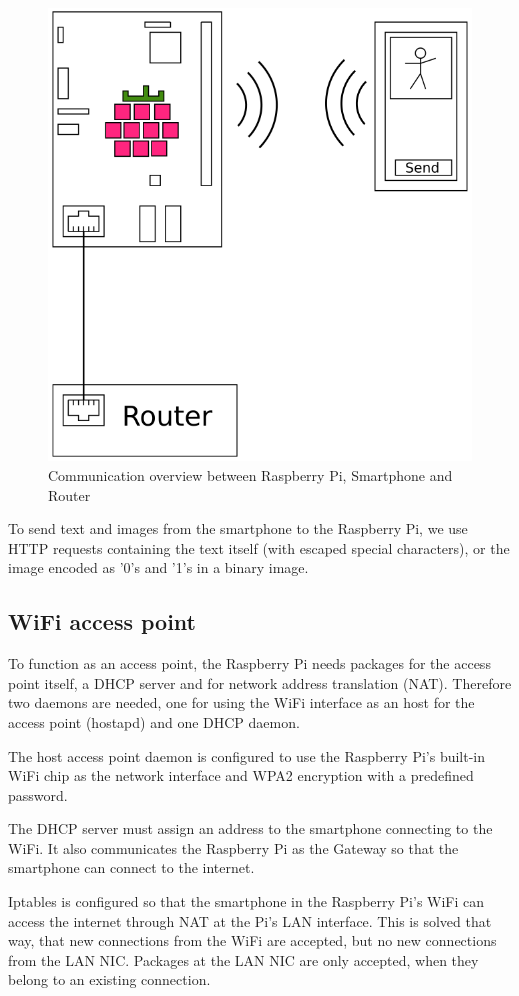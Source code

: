 \documentclass[conference]{IEEEtran}
\begin{document}
\begin{figure}[ht]
\centering
\includegraphics[width=0.75\linewidth]{pics/RasPi-MC}
\caption{Communication overview between Raspberry Pi, Smartphone and Router}
\label{FIG:COMMUNICATION}
\end{figure}

To send text and images from the smartphone to the Raspberry Pi, we use HTTP requests containing the text itself (with escaped special characters), or the image encoded as '0's and '1's in a binary image.

\subsection{WiFi access point}
To function as an access point, the Raspberry Pi needs packages for the access point itself, a DHCP server and for network address translation (NAT). Therefore two daemons are needed, one for using the WiFi interface as an host for the access point (hostapd) and one DHCP daemon.

The host access point daemon is configured to use the Raspberry Pi's built-in WiFi chip as the network interface and WPA2  encryption with a predefined password.

The DHCP server must assign an address to the smartphone connecting to the WiFi. It also communicates the Raspberry Pi as the Gateway so that the smartphone can connect to the internet.

Iptables is configured so that the smartphone in the Raspberry Pi's WiFi can access the internet through NAT at the Pi's LAN interface. This is solved that way, that new connections from the WiFi are accepted, but no new connections from the LAN NIC. Packages at the LAN NIC are only accepted, when they belong to an existing connection.
\end{document}
